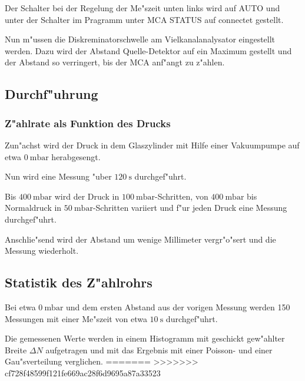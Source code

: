	Der Schalter bei der Regelung der Me"szeit unten links wird auf AUTO  und unter der Schalter im Pragramm unter MCA STATUS 
	auf connectet gestellt.

	Nun m"ussen die Diskreminatorschwelle am Vielkanalanalysator eingestellt werden. Dazu wird der Abstand Quelle-Detektor auf ein Maximum gestellt und der Abstand so verringert, bis der MCA anf"angt zu z"ahlen.

	\subsection{Durchf"uhrung} %
	\label{sub:durchf_uhrung}
	

	\subsubsection{Z"ahlrate als Funktion des Drucks} %
	\label{sub:subsection_name}
	
	Zun"achst wird der Druck in dem Glaszylinder mit Hilfe einer Vakuumpumpe auf etwa $\SI{0}{\milli\bar}$ herabgesengt.

	Nun wird eine Messung "uber $\SI{120}{\second}$ durchgef"uhrt.

	Bis $\SI{400}{\milli\bar}$ wird der Druck in $\SI{100}{\milli\bar}$-Schritten, von $\SI{400}{\milli\bar}$ bis Normaldruck in $\SI{50}{\milli\bar}$-Schritten variiert und f"ur jeden Druck eine Messung durchgef"uhrt.

	Anschlie"send wird der Abstand um wenige Millimeter vergr"o"sert und die Messung wiederholt.

	\subsection{Statistik des Z"ahlrohrs} %
	\label{sub:statistik_des_z_ahlrohrs}
	
	Bei etwa $\SI{0}{\milli\bar}$ und dem ersten Abstand aus der vorigen Messung werden 150 Messungen mit einer Me"szeit von etwa $\SI{10}{\second}$ durchgef"uhrt.

	Die gemessenen Werte werden in einem Histogramm mit geschickt gew"ahlter Breite $\Delta N$ aufgetragen und mit das Ergebnis mit einer Poisson- und einer Gau"sverteilung verglichen.
=======
\label{sec:durchfuehrung}
>>>>>>> cf728f48599f121fe669ac28f6d9695a87a33523
